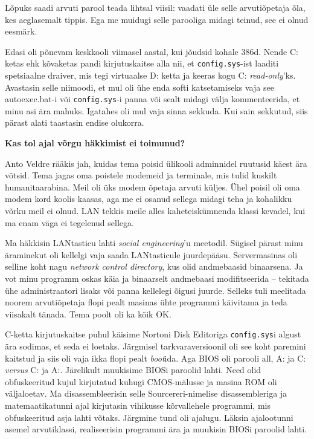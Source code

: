 Lõpuks saadi arvuti parool teada lihtsal viisil: vaadati üle selle
arvutiõpetaja õla, kes aeglasemalt tippis. Ega me muidugi
selle parooliga midagi teinud, see ei olnud eesmärk. 

Edasi oli põnevam keskkooli viimasel aastal, kui jõudsid kohale 386d. Nende C: ketas ehk
kõvaketas pandi kirjutuskaitse alla nii, et
\verb|config.sys|-ist laaditi spetsiaalne draiver, mis tegi virtuaalse D: ketta ja keeras kogu C:
\emph{read-only}'ks. Avastasin selle niimoodi, et mul oli ühe enda
softi katsetamiseks vaja see autoexec.bat-i või \verb|config.sys|-i panna või
sealt midagi välja kommenteerida, et minu asi ära mahuks. Igatahes oli mul vaja sinna sekkuda. Kui sain sekkutud, siis pärast
alati taastasin endise olukorra.

\textbf{Kas tol ajal võrgu häkkimist ei toimunud?}

Anto Veldre rääkis jah, kuidas tema poisid
ülikooli adminnidel ruutusid käest ära võtsid. Tema jagas oma poistele
modemeid ja terminale, mis tulid kuskilt humanitaarabina. Meil oli üks modem
õpetaja arvuti küljes. Ühel poisil oli oma modem kord koolis kaasas, aga me ei osanud sellega midagi teha ja kohalikku võrku meil ei olnud.
LAN tekkis meile alles kaheteiskümnenda
klassi kevadel, kui ma enam väga ei tegelenud sellega. 

Ma häkkisin LANtasticu
lahti \emph{social engineering}'u meetodil. Sügisel pärast minu äraminekut oli
kellelgi vaja saada LANtasticule juurdepääsu. Servermasinas oli selline koht
nagu \emph{network control directory}, kus olid andmebaasid binaarsena. Ja vot
minu programm oskas käia ja binaarselt andmebaasi modifitseerida -- tekitada
ühe administraatori lisaks või panna kellelegi õigusi juurde. Selleks
tuli meelitada noorem arvutiõpetaja flopi pealt masinas ühte programmi käivitama ja teda viisakalt tänada. Tema poolt oli ka kõik OK.

C-ketta kirjutuskaitse puhul käisime Nortoni Disk
Editoriga \verb|config.sys|i algust ära sodimas, et seda ei
loetaks. Järgmisel tarkvaraversioonil oli see koht paremini kaitstud ja siis
oli vaja ikka flopi pealt \emph{boot}ida. Aga BIOS oli parooli all, A: ja C: \emph{versus} C: ja
A:. Järelikult muukisime BIOSi paroolid lahti. Need olid obfuskeeritud
kujul kirjutatud kuhugi CMOS-mälusse ja masina ROM oli väljaloetav. Ma disassembleerisin selle Sourcereri-nimelise disassembleriga ja matemaatikatunni ajal kirjutasin vihikusse kõrvallehele programmi,
mis obfuskeeritud asja lahti võtaks. Järgmine tund oli ajalugu. Läksin
ajalootunni asemel arvutiklassi, realiseerisin programmi ära ja muukisin
BIOSi paroolid lahti. 

